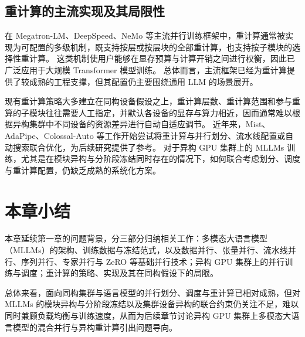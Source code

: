 \subsection{重计算的主流实现及其局限性}

在 Megatron-LM、DeepSpeed、NeMo 等主流并行训练框架中，重计算通常被实现为可配置的多级机制，既支持按层或按层块的全部重计算，也支持按子模块的选择性重计算\cite{megatron2023}。
这类机制使用户能够在显存预算与计算开销之间进行权衡，因此已广泛应用于大规模 Transformer 模型训练。
总体而言，主流框架已经为重计算提供了较成熟的工程支撑，但其配置仍主要围绕通用 LLM 的场景展开。

现有重计算策略大多建立在同构设备假设之上，重计算层数、重计算范围和参与重算的子模块往往需要人工指定，并默认各设备的显存与算力相近，因而通常难以根据异构集群中不同设备的资源差异进行自动自适应调节。
近年来，Mist\cite{mist2025}、AdaPipe\cite{adapipe2024}、Colossal-Auto\cite{colossal_auto} 等工作开始尝试将重计算与并行划分、流水线配置或自动搜索联合优化，为后续研究提供了参考。
对于异构 GPU 集群上的 MLLMs 训练，尤其是在模块异构与分阶段冻结同时存在的情况下，如何联合考虑划分、调度与重计算配置，仍缺乏成熟的系统化方案。

\section{本章小结}

本章延续第一章的问题背景，分三部分归纳相关工作：多模态大语言模型（MLLMs）的架构、训练数据与冻结范式，以及数据并行、张量并行、流水线并行、序列并行、专家并行与 ZeRO 等基础并行技术；异构 GPU 集群上的并行训练与调度；重计算的策略、实现及其在同构假设下的局限。

总体来看，面向同构集群与语言模型的并行划分、调度与重计算已相对成熟，但对 MLLMs 的模块异构与分阶段冻结以及集群设备异构的联合约束仍关注不足，难以同时兼顾负载均衡与训练速度，从而为后续章节讨论异构 GPU 集群上多模态大语言模型的混合并行与异构重计算引出问题导向。